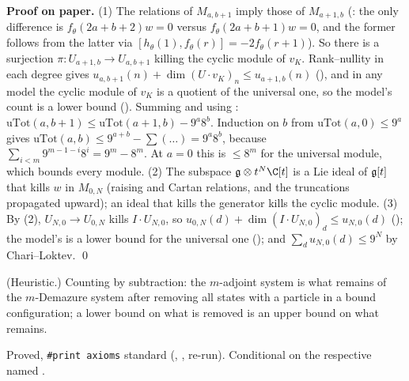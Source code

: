 \textbf{Proof on paper.} (1) The relations of $M_{a,b+1}$ imply those of $M_{a+1,b}$ (: the only
difference is $f_\theta(2a+b+2)w=0$ versus $f_\theta(2a+b+1)w=0$, and the former follows from the latter via
$[h_\theta(1),f_\theta(r)]=-2f_\theta(r+1)$). So there is a surjection $\pi:U_{a+1,b}\to U_{a,b+1}$ killing the cyclic module of
$v_K$. Rank--nullity in each degree gives $u_{a,b+1}(n)+\dim(U\cdot v_K)_n\le u_{a+1,b}(n)$ (), and in any
model the cyclic module of $v_K$ is a quotient of the universal one, so the model's count is a lower bound
(). Summing and using : $\mathrm{uTot}(a,b+1)\le\mathrm{uTot}(a+1,b)-9^a8^b$. Induction on $b$ from
$\mathrm{uTot}(a,0)\le9^a$ gives $\mathrm{uTot}(a,b)\le9^{a+b}-\sum(\dots)=9^a8^b$, because
$\sum_{i<m}9^{m-1-i}8^i=9^m-8^m$. At $a=0$ this is $\le8^m$ for the universal module, which bounds every module.
(2) The subspace $\ltwentysixg\otimes t^N\C[t]$ is a Lie ideal of $\mathfrak g[t]$ that kills $w$ in $M_{0,N}$ (raising and
Cartan relations, and the truncations propagated upward); an ideal that kills the generator kills the cyclic module.
(3) By (2), $U_{N,0}\to U_{0,N}$ kills $I\cdot U_{N,0}$, so $u_{0,N}(d)+\dim(I\cdot U_{N,0})_d\le u_{N,0}(d)$
(); the model's  is a lower bound for the universal one (); and $\sum_du_{N,0}(d)\le9^N$
by Chari--Loktev. \qed

\begin{physics}
(Heuristic.) Counting by subtraction: the $m$-adjoint system is what remains of the $m$-Demazure system after removing all states with a
particle in a bound configuration; a lower bound on what is removed is an upper bound on what remains.
\end{physics}

\begin{status}
Proved, \texttt{\#print axioms} standard (, ,
 re-run). Conditional on the respective named .
\end{status}

